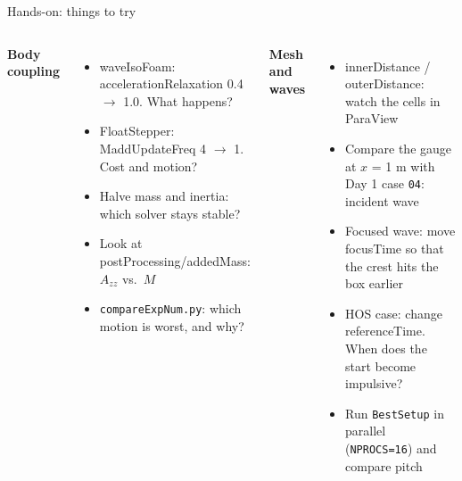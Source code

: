 \documentclass[aspectratio=169,10pt]{beamer}
\newcommand{\file}[1]{{\leavevmode\ttfamily\color{deep}#1}}
\newcommand{\key}[1]{{\leavevmode\ttfamily\color{sea}#1}}
\begin{document}
{
 \renewcommand{\key}[1]{{\leavevmode\ttfamily\color{sand}#1}}
 \renewcommand{\file}[1]{{\leavevmode\ttfamily\color{sand}#1}}
\begin{frame}[plain]{Hands-on: things to try}
  \small
  \begin{columns}[T]
    \color{foam}
    {\color{sand}\bfseries Body coupling}
    \begin{itemize}
      \item waveIsoFoam: \key{accelerationRelaxation} 0.4 $\rightarrow$ 1.0. What happens?
      \item FloatStepper: \key{MaddUpdateFreq} 4 $\rightarrow$ 1. Cost and motion?
      \item Halve mass and inertia: which solver stays stable?
      \item Look at \file{postProcessing/addedMass}: $A_{zz}$ vs.\ $M$
      \item \texttt{compareExpNum.py}: which motion is worst, and why?
    \end{itemize}
    \color{foam}
    {\color{sand}\bfseries Mesh and waves}
    \begin{itemize}
      \item \key{innerDistance} / \key{outerDistance}: watch the cells in ParaView
      \item Compare the gauge at $x$ = 1 m with Day 1 case \texttt{04}: incident wave
      \item Focused wave: move \key{focusTime} so that the crest hits the box earlier
      \item HOS case: change \key{referenceTime}. When does the start become impulsive?
      \item Run \texttt{BestSetup} in parallel (\texttt{NPROCS=16}) and compare pitch
    \end{itemize}
  \end{columns}
\end{frame}}
\end{document}
